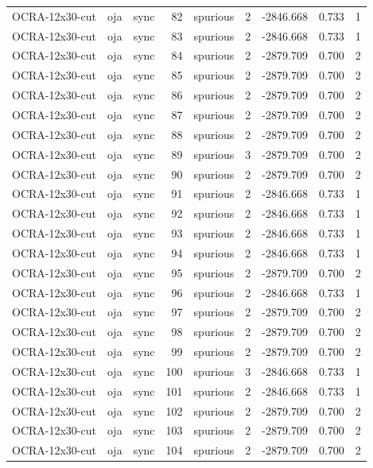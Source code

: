 \begin{tabular}{lllrlrrrr}
OCRA-12x30-cut & oja & sync & 82 & spurious & 2 & -2846.668 & 0.733 & 1 \\
OCRA-12x30-cut & oja & sync & 83 & spurious & 2 & -2846.668 & 0.733 & 1 \\
OCRA-12x30-cut & oja & sync & 84 & spurious & 2 & -2879.709 & 0.700 & 2 \\
OCRA-12x30-cut & oja & sync & 85 & spurious & 2 & -2879.709 & 0.700 & 2 \\
OCRA-12x30-cut & oja & sync & 86 & spurious & 2 & -2879.709 & 0.700 & 2 \\
OCRA-12x30-cut & oja & sync & 87 & spurious & 2 & -2879.709 & 0.700 & 2 \\
OCRA-12x30-cut & oja & sync & 88 & spurious & 2 & -2879.709 & 0.700 & 2 \\
OCRA-12x30-cut & oja & sync & 89 & spurious & 3 & -2879.709 & 0.700 & 2 \\
OCRA-12x30-cut & oja & sync & 90 & spurious & 2 & -2879.709 & 0.700 & 2 \\
OCRA-12x30-cut & oja & sync & 91 & spurious & 2 & -2846.668 & 0.733 & 1 \\
OCRA-12x30-cut & oja & sync & 92 & spurious & 2 & -2846.668 & 0.733 & 1 \\
OCRA-12x30-cut & oja & sync & 93 & spurious & 2 & -2846.668 & 0.733 & 1 \\
OCRA-12x30-cut & oja & sync & 94 & spurious & 2 & -2846.668 & 0.733 & 1 \\
OCRA-12x30-cut & oja & sync & 95 & spurious & 2 & -2879.709 & 0.700 & 2 \\
OCRA-12x30-cut & oja & sync & 96 & spurious & 2 & -2846.668 & 0.733 & 1 \\
OCRA-12x30-cut & oja & sync & 97 & spurious & 2 & -2879.709 & 0.700 & 2 \\
OCRA-12x30-cut & oja & sync & 98 & spurious & 2 & -2879.709 & 0.700 & 2 \\
OCRA-12x30-cut & oja & sync & 99 & spurious & 2 & -2879.709 & 0.700 & 2 \\
OCRA-12x30-cut & oja & sync & 100 & spurious & 3 & -2846.668 & 0.733 & 1 \\
OCRA-12x30-cut & oja & sync & 101 & spurious & 2 & -2846.668 & 0.733 & 1 \\
OCRA-12x30-cut & oja & sync & 102 & spurious & 2 & -2879.709 & 0.700 & 2 \\
OCRA-12x30-cut & oja & sync & 103 & spurious & 2 & -2879.709 & 0.700 & 2 \\
OCRA-12x30-cut & oja & sync & 104 & spurious & 2 & -2879.709 & 0.700 & 2 \\

\end{tabular}
